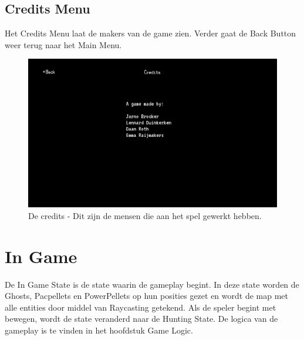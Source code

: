 \documentclass{report}
\begin{document}
    \subsection{Credits Menu} %
    \label{sub:credits_menu}
    Het Credits Menu laat de makers van de game zien. Verder gaat de Back Button weer terug naar het Main Menu.
    \begin{figure}[!ht]
      \centering
      \includegraphics[width=.95\textwidth]{technisch verslag imgs/credits.png}
      \caption{De credits - Dit zijn de mensen die aan het spel gewerkt hebben.}
    \end{figure}

  \section{In Game} %
  \label{sec:in_game}
  De In Game State is de state waarin de gameplay begint. In deze state worden de Ghosts, Pacpellets en PowerPellets op hun posities gezet en wordt de map met alle entities door middel van Raycasting getekend. Als de speler begint met bewegen, wordt de state veranderd naar de Hunting State. De logica van de gameplay is te vinden in het hoofdstuk Game Logic.
\end{document}
